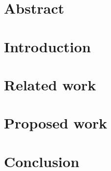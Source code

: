 \documentclass[11pt,a4paper,openany,twoside]{book}
\begin{document}

    




    \chapter*{\textbf{Abstract}}
    \thispagestyle{empty}
    \label{ch:abstract}
    

\frontmatter


  \tableofcontents
  \listoffigures
  \let\cleardoublepage\clearpage %
  \listoftables
  
  



  

\mainmatter    %



    \chapter{Introduction}
    \thispagestyle{empty}
    \label{intro}
    



    \chapter{Related work}
    \thispagestyle{empty}
    \label{related_work}
    
    
    
    
    \chapter{Proposed work}
    \thispagestyle{empty}
    \label{Proposed_research}
    
    
    
    
    \chapter{Conclusion}
    \thispagestyle{empty}
    \label{Conclusion}
    

    \appendix
    \thispagestyle{empty}
    \label{appendix}
    



    
    
    
    
\end{document}
